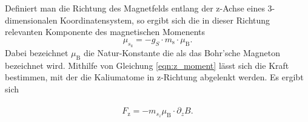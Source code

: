 Definiert man die Richtung des Magnetfelds entlang der z-Achse eines
3-dimensionalen Koordinatensystem, so ergibt sich die in dieser Richtung
relevanten Komponente des magnetischen Momenents
\begin{equation}
  \label{eqn:z_moment}
\mu_{s_\text{z}} = -g_{S} \cdot m_\text{s} \cdot \mu_\text{B}.
\end{equation}
Dabei bezeichnet $\mu_\text{B}$ die Natur-Konstante die als das Bohr'sche
Magneton bezeichnet wird.
Mithilfe von Gleichung \eqref{eqn:z_moment} lässt sich die Kraft bestimmen,
mit der die Kaliumatome in z-Richtung abgelenkt werden. Es ergibt sich\\ \\
\begin{equation}
  \label{eqn:z_kraft}
  F_\text{z} = - m_{s_{z}} \mu_\text{B} \cdot \partial_{z}B .
\end{equation}
